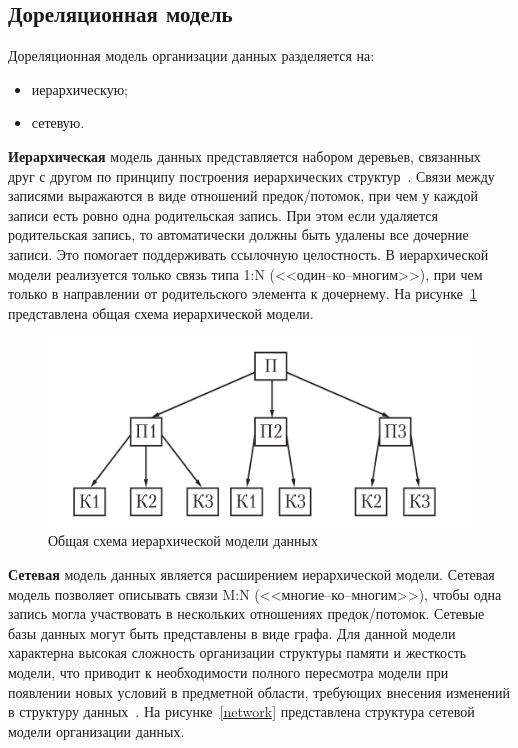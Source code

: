 \subsection{Дореляционная модель}
Дореляционная модель организации данных разделяется на:
\begin{itemize}
	\item иерархическую;
	\item сетевую.
	
\end{itemize}

\textbf{Иерархическая} модель данных представляется набором деревьев, связанных друг с другом по принципу построения иерархических структур~\cite{struzhkin}. Связи между записями выражаются в виде отношений предок/потомок, при чем у каждой записи есть ровно одна родительская запись. При этом если удаляется родительская запись, то автоматически должны быть удалены все дочерние записи. Это помогает поддерживать ссылочную целостность. В иерархической модели реализуется только связь типа 1:N (<<один--ко--многим>>), при чем только в направлении от родительского элемента к дочернему. На рисунке~\ref{hierarchy} представлена общая схема иерархической модели.

\begin{figure}[H]
	\centering
	\includegraphics[width=0.6\linewidth]{img/hierarchy.png}
	\caption{Общая схема иерархической модели данных}
	\label{hierarchy}
\end{figure}

\textbf{Сетевая} модель данных является расширением иерархической модели. Сетевая модель позволяет описывать связи M:N (<<многие--ко--многим>>), чтобы одна запись могла участвовать в нескольких отношениях предок/потомок. Сетевые базы данных могут быть представлены в виде графа. Для данной модели характерна высокая сложность организации структуры памяти и жесткость модели, что приводит к необходимости полного  пересмотра модели при появлении новых условий в предметной области, требующих внесения изменений в структуру данных~\cite{struzhkin}. На рисунке~\ref{network} представлена структура сетевой модели организации данных.


